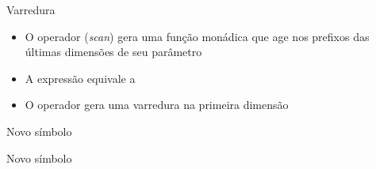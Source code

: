 \begin{frame}[fragile]{Varredura}

    \begin{itemize}
        \item O operador  (\textit{scan}) gera uma função monádica que age nos
            prefixos das últimas dimensões de seu parâmetro

        \item A expressão  equivale a 

        \item O operador  gera uma varredura na primeira dimensão
    \end{itemize}
\end{frame}

\begin{frame}[fragile]{Novo símbolo}
\end{frame}

\begin{frame}[fragile]{Novo símbolo}

\end{frame}
